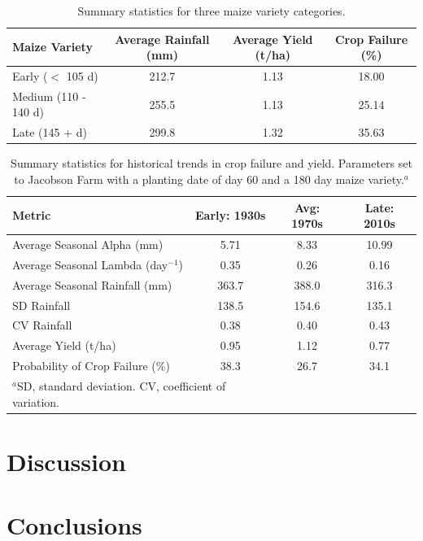\documentclass[draft]{agujournal2019}
\begin{document}
\begin{table}
\caption{Summary statistics for three maize variety categories.}
\begin{tabular}{lccc}
\hline
Maize Variety &  Average Rainfall (mm) &  Average Yield (t/ha) &  Crop Failure (\%) \\
\hline
Early ($<$ 105 d) & 212.7 & 1.13 & 18.00 \\
Medium (110 - 140 d) & 255.5 & 1.13 & 25.14 \\
Late (145 + d) & 299.8 & 1.32 & 35.63 \\
\hline
\end{tabular}
\label{varieties}
\end{table}

\begin{table}
\caption{Summary statistics for historical trends in crop failure and yield. Parameters set to Jacobson Farm with a planting date of day 60 and a 180 day maize variety.$^{a}$}
\centering
\begin{tabular}{l ccc}
\hline
 Metric  & Early: 1930s & Avg: 1970s & Late: 2010s  \\
\hline
   Average Seasonal Alpha (mm) & 5.71 & 8.33 & 10.99   \\
   Average Seasonal Lambda (day$^{-1}$) & 0.35 & 0.26 & 0.16  \\
   Average Seasonal Rainfall (mm) & 363.7 & 388.0 & 316.3  \\
   SD Rainfall & 138.5 & 154.6 & 135.1 \\
   CV Rainfall & 0.38 & 0.40 & 0.43 \\
   Average Yield (t/ha) & 0.95 & 1.12 & 0.77 \\
   Probability of Crop Failure (\%) & 38.3 & 26.7 & 34.1 \\
\hline
\multicolumn{2}{l}{$^{a}$SD, standard deviation. CV, coefficient of variation.}
\end{tabular}
\label{summary_cropoutcomes}
\end{table}


\section{Discussion} \label{discussion}



\section{Conclusions} \label{conclusion}
\end{document}
